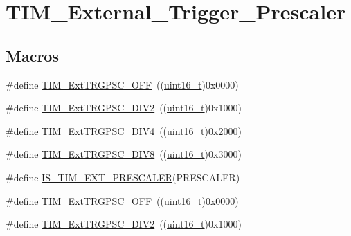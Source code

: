 \hypertarget{group___t_i_m___external___trigger___prescaler}{}\section{T\+I\+M\+\_\+\+External\+\_\+\+Trigger\+\_\+\+Prescaler}
\label{group___t_i_m___external___trigger___prescaler}
\subsection*{Macros}
\begin{DoxyCompactItemize}
\item 
\#define \hyperlink{group___t_i_m___external___trigger___prescaler_ga1b21757d5d1b708edca7e20481797e96}{T\+I\+M\+\_\+\+Ext\+T\+R\+G\+P\+S\+C\+\_\+\+O\+FF}~((\hyperlink{_p_e___types_8h_a1f1825b69244eb3ad2c7165ddc99c956}{uint16\+\_\+t})0x0000)
\item 
\#define \hyperlink{group___t_i_m___external___trigger___prescaler_ga446ed7f1bc28bcb295c43886da582e47}{T\+I\+M\+\_\+\+Ext\+T\+R\+G\+P\+S\+C\+\_\+\+D\+I\+V2}~((\hyperlink{_p_e___types_8h_a1f1825b69244eb3ad2c7165ddc99c956}{uint16\+\_\+t})0x1000)
\item 
\#define \hyperlink{group___t_i_m___external___trigger___prescaler_ga1de0031af7654fac2f29705f1da146c6}{T\+I\+M\+\_\+\+Ext\+T\+R\+G\+P\+S\+C\+\_\+\+D\+I\+V4}~((\hyperlink{_p_e___types_8h_a1f1825b69244eb3ad2c7165ddc99c956}{uint16\+\_\+t})0x2000)
\item 
\#define \hyperlink{group___t_i_m___external___trigger___prescaler_gac2fe5014d69a93ce0a22b9f3f5a7d19a}{T\+I\+M\+\_\+\+Ext\+T\+R\+G\+P\+S\+C\+\_\+\+D\+I\+V8}~((\hyperlink{_p_e___types_8h_a1f1825b69244eb3ad2c7165ddc99c956}{uint16\+\_\+t})0x3000)
\item 
\#define \hyperlink{group___t_i_m___external___trigger___prescaler_ga615587e6aae397d9fe8166004e7324f2}{I\+S\+\_\+\+T\+I\+M\+\_\+\+E\+X\+T\+\_\+\+P\+R\+E\+S\+C\+A\+L\+ER}(P\+R\+E\+S\+C\+A\+L\+ER)
\item 
\#define \hyperlink{group___t_i_m___external___trigger___prescaler_ga1b21757d5d1b708edca7e20481797e96}{T\+I\+M\+\_\+\+Ext\+T\+R\+G\+P\+S\+C\+\_\+\+O\+FF}~((\hyperlink{_p_e___types_8h_a1f1825b69244eb3ad2c7165ddc99c956}{uint16\+\_\+t})0x0000)
\item 
\#define \hyperlink{group___t_i_m___external___trigger___prescaler_ga446ed7f1bc28bcb295c43886da582e47}{T\+I\+M\+\_\+\+Ext\+T\+R\+G\+P\+S\+C\+\_\+\+D\+I\+V2}~((\hyperlink{_p_e___types_8h_a1f1825b69244eb3ad2c7165ddc99c956}{uint16\+\_\+t})0x1000)

\end{DoxyCompactItemize}
